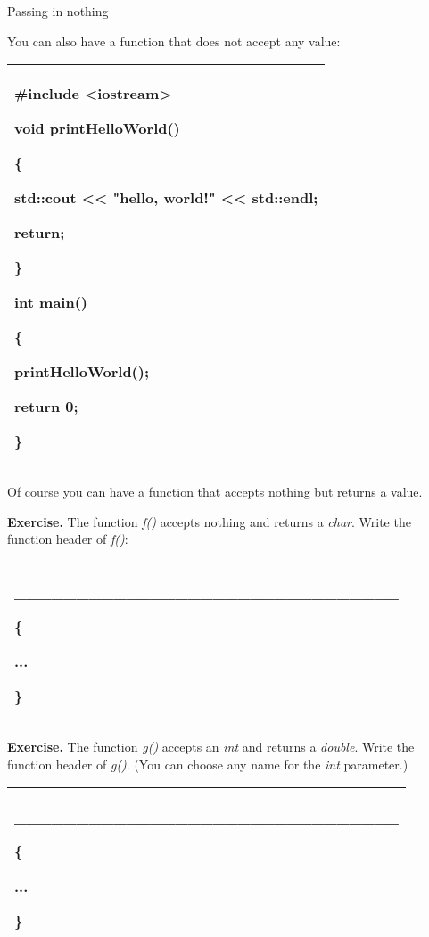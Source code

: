 \documentclass[
]{article}
\begin{document}
Passing in nothing

You can also have a function that does not accept any value:

\begin{longtable}[]{@{}l@{}}
\toprule
\endhead
\begin{minipage}[t]{0.97\columnwidth}\raggedright
\#include \textless iostream\textgreater{}

void printHelloWorld()

\{

std::cout \textless\textless{} "hello, world!" \textless\textless{}
std::endl;

return;

\}

int main()

\{

printHelloWorld();

return 0;

\}\strut
\end{minipage}\tabularnewline
\bottomrule
\end{longtable}

Of course you can have a function that accepts nothing but returns a
value.

\textbf{Exercise.} The function \emph{f()} accepts nothing and returns a
\emph{char}. Write the function header of \emph{f()}:

\begin{longtable}[]{@{}l@{}}
\toprule
\endhead
\begin{minipage}[t]{0.97\columnwidth}\raggedright
\_\_\_\_\_\_\_\_\_\_\_\_\_\_\_\_\_\_\_\_\_\_\_\_\_\_\_\_\_\_\_

\{

...

\}\strut
\end{minipage}\tabularnewline
\bottomrule
\end{longtable}

\textbf{Exercise.} The function \emph{g()} accepts an \emph{int} and
returns a \emph{double}. Write the function header of \emph{g()}. (You
can choose any name for the \emph{int} parameter.)

\begin{longtable}[]{@{}l@{}}
\toprule
\endhead
\begin{minipage}[t]{0.97\columnwidth}\raggedright
\_\_\_\_\_\_\_\_\_\_\_\_\_\_\_\_\_\_\_\_\_\_\_\_\_\_\_\_\_\_\_

\{

...

\}\strut
\end{minipage}\tabularnewline
\bottomrule
\end{longtable}
\end{document}
